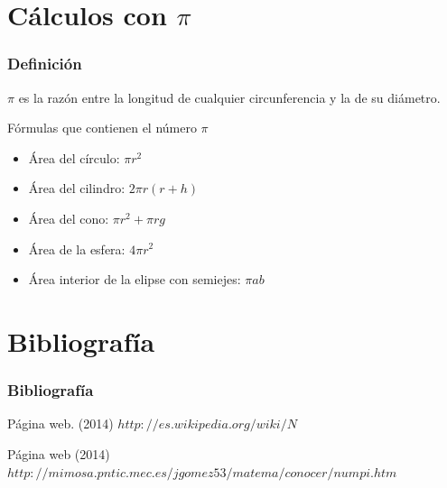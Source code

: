 \documentclass{beamer}
\begin{document}
\section{Cálculos con $\pi$}
  
\begin{frame}
\frametitle{Definición}
$\pi$ es la razón entre la longitud de cualquier circunferencia y la de su diámetro.
\begin{block}{Fórmulas que contienen el número $\pi$}
  \begin{itemize}
  \item
   Área del círculo: $\pi r^2$
  \pause

  \item
   Área del cilindro: $2\pi r(r+h)$
  \pause

  \item
   Área del cono: $\pi r^2 +\pi rg$
  \pause

  \item
   Área de la esfera: $4\pi r^2$
  \pause

  \item
   Área interior de la elipse con semiejes: $\pi ab$
  \pause

  \end{itemize}
\end{block}

\end{frame}
\section{Bibliografía}
\begin{frame}
  \frametitle{Bibliografía}

  \begin{thebibliography}{10}
    \beamertemplatebookbibitems
    Página web. 
    (2014) 
   {\small $http://es.wikipedia.org/wiki/N$}

    \beamertemplatebookbibitems
    Página web
    (2014) 
   {\small $http://mimosa.pntic.mec.es/jgomez53/matema/conocer/numpi.htm$}

   \end{thebibliography}
\end{frame}
\end{document}
